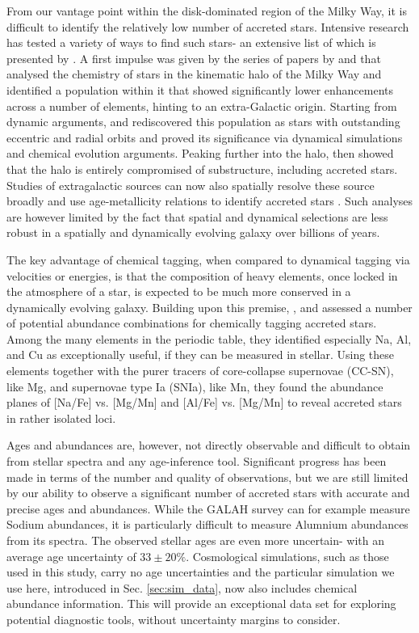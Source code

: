 \documentclass[fleqn,usenatbib]{mnras}
\begin{document}
From our vantage point within the disk-dominated region of the Milky Way, it is difficult to identify the relatively low number of accreted stars. Intensive research has tested a variety of ways to find such stars- an extensive list of which is presented by \citet{Buder2022}. A first impulse was given by the series of papers by \citet{Nissen2010, Nissen2011, Nissen2014} and \citet{Schuster2012} that analysed the chemistry of stars in the kinematic halo of the Milky Way and identified a population within it that showed significantly lower enhancements across a number of elements, hinting to an extra-Galactic origin. Starting from dynamic arguments, \citet{Belokurov2018} and \citet{Helmi2018} rediscovered this population as stars with outstanding eccentric and radial orbits and proved its significance via dynamical simulations and chemical evolution arguments. Peaking further into the halo, \citet{Naidu2020} then showed that the halo is entirely compromised of substructure, including accreted stars. Studies of extragalactic sources can now also spatially resolve these source broadly and use age-metallicity relations to identify accreted stars \citep{Martig2021}. Such analyses are however limited by the fact that spatial and dynamical selections are less robust in a spatially and dynamically evolving galaxy over billions of years.\par 

The key advantage of chemical tagging, when compared to dynamical tagging via velocities or energies, is that the composition of heavy elements, once locked in the atmosphere of a star, is expected to be much more conserved in a dynamically evolving galaxy. Building upon this premise, \citet{Hawkins2015}, \citet{Das2020} and \citet{Buder2022} assessed a number of potential abundance combinations for chemically tagging accreted stars. Among the many elements in the periodic table, they identified especially Na, Al, and Cu as exceptionally useful, if they can be measured in stellar. Using these elements together with the purer tracers of core-collapse supernovae (CC-SN), like Mg, and supernovae type Ia (SNIa), like Mn, they found the abundance planes of [Na/Fe] vs. [Mg/Mn] and [Al/Fe] vs. [Mg/Mn] to reveal accreted stars in rather isolated loci.\par 

Ages and abundances are, however, not directly observable and difficult to obtain from stellar spectra and any age-inference tool. Significant progress has been made in terms of the number and quality of observations, but we are still limited by our ability to observe a significant number of accreted stars with accurate and precise ages and abundances. While the GALAH survey can for example measure Sodium abundances, it is particularly difficult to measure Alumnium abundances from its spectra. The observed stellar ages are even more uncertain- with an average age uncertainty of $33\pm20\%$. Cosmological simulations, such as those used in this study, carry no age uncertainties and the particular simulation we use here, introduced in Sec. \ref{sec:sim_data}, \citep{Buck2021} now also includes chemical abundance information. This will provide an exceptional data set for exploring potential diagnostic tools, without uncertainty margins to consider.
\end{document}
